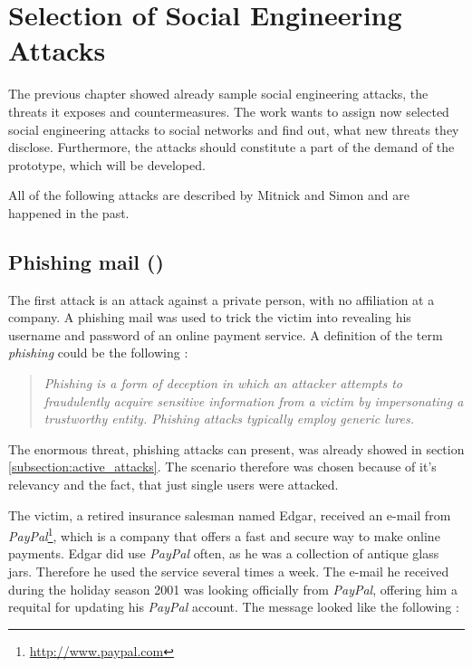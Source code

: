 \chapter{Selection of Social Engineering Attacks}
\label{chapter:attacks}

The previous chapter showed already sample social engineering attacks, the
threats it exposes and countermeasures. The work wants to assign now selected
social engineering attacks to social networks and find out, what new threats
they disclose. Furthermore, the attacks should constitute a part of the demand
of the prototype, which will be developed.

All of the following attacks are described by Mitnick and Simon
\cite{mitnick2003} and are happened in the past.

\section[Phishing mail]{Phishing mail (\cite[pp. 97-100]{mitnick2003})}
\label{sec:phishing_mail}

The first attack is an attack against a private person, with no affiliation at
a company. A phishing mail was used to trick the victim into revealing his
username and password of an online payment service.  A definition of the term
\textit{phishing} could be the following \cite{jagatic2007}:

\begin{quote}
\textit{Phishing is a form of deception in which an attacker attempts to
fraudulently acquire sensitive information from a victim by impersonating a
trustworthy entity. Phishing attacks typically employ generic
\glqq{}lures\grqq{}.}
\end{quote}

The enormous threat, phishing attacks can present, was already showed in 
section \ref{subsection:active_attacks}. The scenario therefore was chosen because of
it's relevancy and the fact, that just single users were attacked.

The victim, a retired insurance salesman named Edgar, received an e-mail from
\textit{PayPal}\footnote{\url{http://www.paypal.com}}, which is a company that
offers a fast and secure way to make online payments. Edgar did use
\textit{PayPal} often, as he was a collection of antique glass jars. Therefore
he used the service several times a week. The e-mail he received during the
holiday season 2001 was looking officially from \textit{PayPal}, offering him a
requital for updating his \textit{PayPal} account. The message looked like the
following \cite[p. 97]{mitnick2003}:

